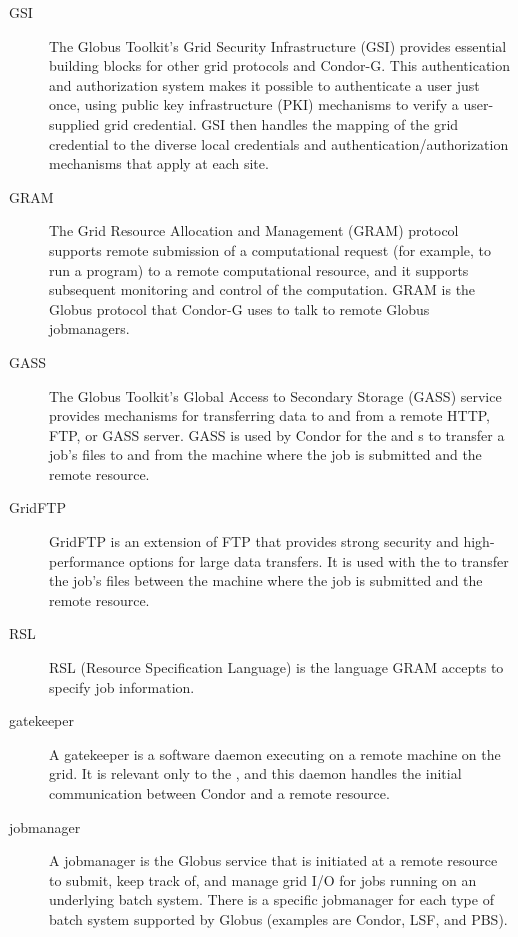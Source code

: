 \begin{description}
\item[GSI]
The Globus Toolkit's Grid Security Infrastructure (GSI) provides essential
building blocks for other grid protocols and Condor-G.
This authentication and authorization system
makes it possible to authenticate a user just once,
using public key infrastructure (PKI) mechanisms to verify
a user-supplied grid credential.
GSI then handles the mapping of the grid credential to the
diverse local credentials and authentication/authorization mechanisms that
apply at each site. 
\item[GRAM]
The Grid Resource Allocation and Management (GRAM) protocol supports remote
submission of a computational request (for example, to run a program)
to a remote computational resource,
and it supports subsequent monitoring and control of the computation. 
GRAM is the Globus protocol that Condor-G uses to talk to remote Globus
  jobmanagers.
\item[GASS]
The Globus Toolkit's Global Access to Secondary Storage (GASS) service provides
mechanisms for transferring data to and from a remote HTTP, FTP, or GASS server. 
GASS is used by Condor for the 
 and  s
to transfer a job's files
to and from the machine where the job is submitted and the remote resource.
\item[GridFTP]
GridFTP is an extension of FTP that provides strong security and 
high-performance options for large data transfers.
It is used with the  
to transfer the job's files between the machine where the job
is submitted and the remote resource.
\item[RSL]
RSL (Resource Specification Language)  is the language GRAM 
accepts to specify job information.
\item[gatekeeper]
A gatekeeper is a software daemon executing on a remote machine on
the grid.
It is relevant only to the  ,
and this daemon handles the initial communication between
Condor and a remote resource.
\item[jobmanager]
A jobmanager is
the Globus service that is initiated at a remote resource to submit,
keep track of, and manage grid I/O for jobs running on 
an underlying batch system.
There is a specific jobmanager for each type of
batch system supported by Globus (examples are Condor, LSF, and PBS).

\end{description}



